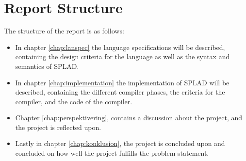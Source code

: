 \section{Report Structure}
The structure of the report is as follows:
\begin{itemize}
	\item In chapter \ref{chap:lanspec} the language specifications will be described, containing the design criteria for the language as well as the syntax and semantics of SPLAD.
	\item In chapter \ref{chap:implementation} the implementation of SPLAD will be described, containing the different compiler phases, the criteria for the compiler, and the code of the compiler.
	\item Chapter \ref{chap:perspektivering}, contains a discussion about the project, and the project is reflected upon. 
	\item Lastly in chapter \ref{chap:konklusion}, the project is concluded upon and concluded on how well the project fulfills the problem statement.
\end{itemize}